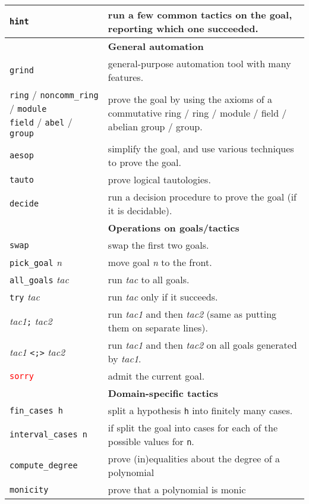 \documentclass[a4paper]{article}
\newcommand{\lean}[1]{{\tt #1}}
\newcommand{\tactic}[1][]{\textit{tac#1}\xspace} %
\newcommand{\nat}{\textit{n}\xspace}
\begin{document}
\begin{center}
\begin{longtable}{@{}lp{113mm}@{}}
  \lean{hint} & run a few common tactics on the goal, reporting which one succeeded. \\
  \hline
  &\textbf{General automation}\\
  \lean{grind} & general-purpose automation tool with many features. \\
  \makecell[lt]{\lean{ring} / \lean{noncomm\_ring} / \lean{module} \\ \lean{field} / \lean{abel} / \lean{group}} & prove the goal by using the axioms of a commutative ring / ring / module / field / abelian group / group. \\
  \lean{aesop} & simplify the goal, and use various techniques to prove the goal. \\
  \lean{tauto} & prove logical tautologies. \\
  \lean{decide} & run a decision procedure to prove the goal (if it is decidable). \\
  \hline
  &\textbf{Operations on goals/tactics}\\
  \lean{swap} & swap the first two goals. \\
  \lean{pick\_goal} \nat & move goal \nat to the front. \\
  \lean{all\_goals} \tactic & run \tactic to all goals. \\
  \lean{try} \tactic & run \tactic only if it succeeds. \\
  \tactic[1]\lean{;} \tactic[2] & run \tactic[1] and then \tactic[2] (same as putting them on separate lines). \\
  \tactic[1] \lean{<;>} \tactic[2] & run \tactic[1] and then \tactic[2] on all goals generated by \tactic[1]. \\
  \textcolor{red}{\lean{sorry}} & admit the current goal.\\
  \hline
  &\textbf{Domain-specific tactics}\\
  \lean{fin\_cases h} & split a hypothesis \lean{h} into finitely many cases. \\
  \lean{interval\_cases n} & if split the goal into cases for each of the possible values for \lean{n}.\\
  \lean{compute\_degree} & prove (in)equalities about the degree of a polynomial \\
  \lean{monicity} & prove that a polynomial is monic \\

\end{longtable}
\end{center}
\end{document}
